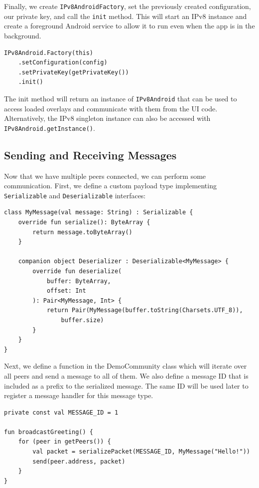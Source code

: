 Finally, we create \texttt{IPv8AndroidFactory}, set the previously created configuration, our private key, and call the \texttt{init} method. This will start an IPv8 instance and create a foreground Android service to allow it to run even when the app is in the background.

\begin{verbatim}
IPv8Android.Factory(this)
    .setConfiguration(config)
    .setPrivateKey(getPrivateKey())
    .init()
\end{verbatim}

The init method will return an instance of \texttt{IPv8Android} that can be used to access loaded overlays and communicate with them from the UI code. Alternatively, the IPv8 singleton instance can also be accessed with \texttt{IPv8Android.getInstance()}.


\subsection{Sending and Receiving Messages}

Now that we have multiple peers connected, we can perform some communication. First, we define a custom payload type implementing \texttt{Serializable} and \texttt{Deserializable} interfaces:

\begin{verbatim}
class MyMessage(val message: String) : Serializable {
    override fun serialize(): ByteArray {
        return message.toByteArray()
    }

    companion object Deserializer : Deserializable<MyMessage> {
        override fun deserialize(
            buffer: ByteArray,
            offset: Int
        ): Pair<MyMessage, Int> {
            return Pair(MyMessage(buffer.toString(Charsets.UTF_8)),
                buffer.size)
        }
    }
}
\end{verbatim}

Next, we define a function in the DemoCommunity class which will iterate over all peers and send a message to all of them. We also define a message ID that is included as a prefix to the serialized message. The same ID will be used later to register a message handler for this message type.

\begin{verbatim}
private const val MESSAGE_ID = 1

fun broadcastGreeting() {
    for (peer in getPeers()) {
        val packet = serializePacket(MESSAGE_ID, MyMessage("Hello!"))
        send(peer.address, packet)
    }
}
\end{verbatim}

